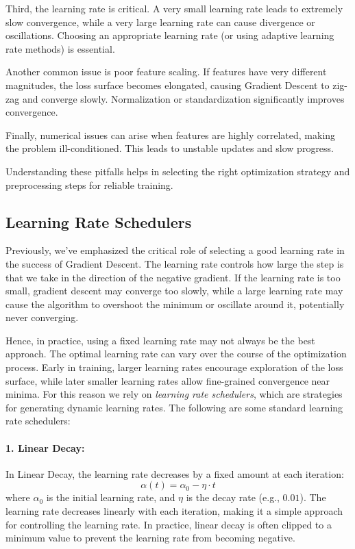 \documentclass{article}
\begin{document}
Third, the learning rate is critical. A very small learning rate leads to extremely slow convergence, while a very large learning rate can cause divergence or oscillations. Choosing an appropriate learning rate (or using adaptive learning rate methods) is essential.

Another common issue is poor feature scaling. If features have very different magnitudes, the loss surface becomes elongated, causing Gradient Descent to zig-zag and converge slowly. Normalization or standardization significantly improves convergence.

Finally, numerical issues can arise when features are highly correlated, making the problem ill-conditioned. This leads to unstable updates and slow progress.

Understanding these pitfalls helps in selecting the right optimization strategy and preprocessing steps for reliable training. \\

\subsection{Learning Rate Schedulers}

Previously, we've emphasized the critical role of selecting a good learning rate in the success of Gradient Descent. The learning rate controls how large the step is that we take in the direction of the negative gradient. If the learning rate is too small, gradient descent may converge too slowly, while a large learning rate may cause the algorithm to overshoot the minimum or oscillate around it, potentially never converging.

Hence, in practice, using a fixed learning rate may not always be the best approach. The optimal learning rate can vary over the course of the optimization process. Early in training, larger learning rates encourage exploration of the loss surface, while later smaller learning rates allow fine-grained convergence near minima. For this reason we rely on \textit{learning rate schedulers}, which are strategies for generating dynamic learning rates. The following are some standard learning rate schedulers:

\paragraph{1. Linear Decay:}
In Linear Decay, the learning rate decreases by a fixed amount at each iteration:
\[
\alpha(t) = \alpha_0 - \eta \cdot t
\]
where \( \alpha_0 \) is the initial learning rate, and \( \eta \) is the decay rate (e.g., \( 0.01 \)). The learning rate decreases linearly with each iteration, making it a simple approach for controlling the learning rate. In practice, linear decay is often clipped to a minimum value to prevent the learning rate from becoming negative.
\end{document}
